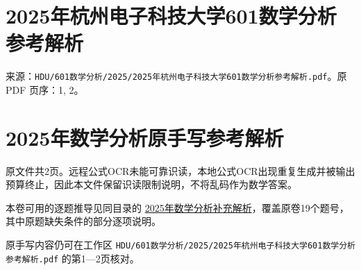 \documentclass[11pt,fontset=fandol]{ctexart}
\begin{document}
\section{2025年杭州电子科技大学601数学分析参考解析}\label{ux5e74ux676dux5ddeux7535ux5b50ux79d1ux6280ux5927ux5b66601ux6570ux5b66ux5206ux6790ux53c2ux8003ux89e3ux6790}

来源：\texttt{HDU/601数学分析/2025/2025年杭州电子科技大学601数学分析参考解析.pdf}。原
PDF 页序：1, 2。

\section{2025年数学分析原手写参考解析}\label{ux5e74ux6570ux5b66ux5206ux6790ux539fux624bux5199ux53c2ux8003ux89e3ux6790}

原文件共2页。远程公式OCR未能可靠识读，本地公式OCR出现重复生成并被输出预算终止，因此本文件保留识读限制说明，不将乱码作为数学答案。

本卷可用的逐题推导见同目录的
\href{2025年数学分析补充解析.md}{2025年数学分析补充解析}，覆盖原卷19个题号，其中原题缺失条件的部分逐项说明。

原手写内容仍可在工作区
\texttt{HDU/601数学分析/2025/2025年杭州电子科技大学601数学分析参考解析.pdf}
的第1---2页核对。
\end{document}
